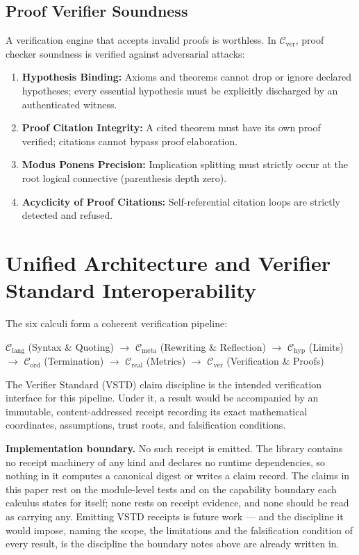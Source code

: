 \documentclass[11pt]{article}
\theoremstyle{definition}
\begin{document}
\subsection{Proof Verifier Soundness}
A verification engine that accepts invalid proofs is worthless. In $\mathcal{C}_{\mathrm{ver}}$, proof checker soundness is verified against adversarial attacks:
\begin{enumerate}
\item \textbf{Hypothesis Binding:} Axioms and theorems cannot drop or ignore declared hypotheses; every essential hypothesis must be explicitly discharged by an authenticated witness.
\item \textbf{Proof Citation Integrity:} A cited theorem must have its own proof verified; citations cannot bypass proof elaboration.
\item \textbf{Modus Ponens Precision:} Implication splitting must strictly occur at the root logical connective (parenthesis depth zero).
\item \textbf{Acyclicity of Proof Citations:} Self-referential citation loops are strictly detected and refused.
\end{enumerate}

\section{Unified Architecture and Verifier Standard Interoperability}
The six calculi form a coherent verification pipeline:
\begin{center}
\small
$\mathcal{C}_{\mathrm{lang}}$ (Syntax \& Quoting) $\longrightarrow$ $\mathcal{C}_{\mathrm{meta}}$ (Rewriting \& Reflection) $\longrightarrow$ $\mathcal{C}_{\mathrm{hyp}}$ (Limits) $\longrightarrow$ $\mathcal{C}_{\mathrm{ord}}$ (Termination) $\longrightarrow$ $\mathcal{C}_{\mathrm{real}}$ (Metrics) $\longrightarrow$ $\mathcal{C}_{\mathrm{ver}}$ (Verification \& Proofs)
\end{center}
The Verifier Standard (VSTD) claim discipline is the intended verification interface for this pipeline. Under it, a result would be accompanied by an immutable, content-addressed receipt recording its exact mathematical coordinates, assumptions, trust roots, and falsification conditions.

\noindent\textbf{Implementation boundary.} No such receipt is emitted. The library contains no receipt machinery of any kind and declares no runtime dependencies, so nothing in it computes a canonical digest or writes a claim record. The claims in this paper rest on the module-level tests and on the capability boundary each calculus states for itself; none rests on receipt evidence, and none should be read as carrying any. Emitting VSTD receipts is future work --- and the discipline it would impose, naming the scope, the limitations and the falsification condition of every result, is the discipline the boundary notes above are already written in.
\end{document}
